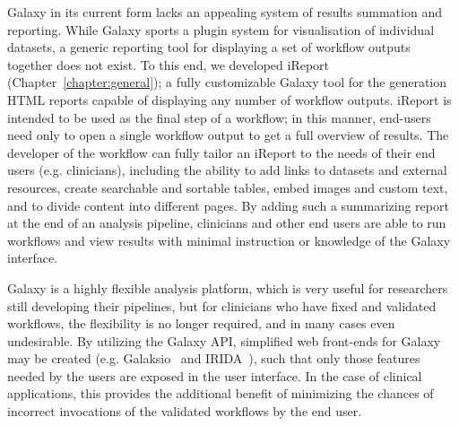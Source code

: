 Galaxy in its current form lacks an appealing system of results summation and reporting. While Galaxy sports a plugin system for visualisation of individual datasets, a generic reporting tool for displaying a set of workflow outputs together does not exist. To this end, we developed iReport (Chapter~\ref{chapter:general}); a fully customizable Galaxy tool for the generation HTML reports capable of displaying any number of workflow outputs.
iReport is intended to be used as the final step of a workflow; in this manner, end-users need only to open a single workflow output to get a full overview of results. The developer of the workflow can fully tailor an iReport to the needs of their end users (e.g. clinicians), including the ability to add links to datasets and external resources, create searchable and sortable tables, embed images and custom text, and to divide content into different pages.
By adding such a summarizing report at the end of an analysis pipeline, clinicians and other end users are able to run workflows and view results with minimal instruction or knowledge of the Galaxy interface.

Galaxy is a highly flexible analysis platform, which is very useful for researchers still developing their pipelines, but for clinicians who have fixed and validated workflows, the flexibility is no longer required, and in many cases even undesirable. By utilizing the Galaxy API, simplified web front-ends for Galaxy may be created (e.g. Galaksio~\cite{klingstrom2017galaksio} and IRIDA~\cite{matthews2018integrated}), such that only those features needed by the users are exposed in the user interface. In the case of clinical applications, this provides the additional benefit of minimizing the chances of incorrect invocations of the validated workflows by the end user.

